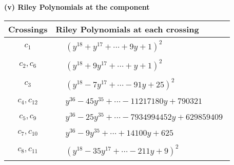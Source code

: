 \documentclass[1p]{elsarticle_modified}
\theoremstyle{definition}
\begin{document}
\newpage\renewcommand{\arraystretch}{1}
\flushleft \textbf{(v) Riley Polynomials at the component}\newline \\
\begin{tabular}{m{50pt}|m{274pt}}
Crossings & \hspace{64pt}Riley Polynomials at each crossing \\
\hline $$\begin{aligned}c_{1}\end{aligned}$$&$\begin{aligned}
&(y^{18}+y^{17}+\cdots+9 y+1)^{2}
\end{aligned}$\\
\hline $$\begin{aligned}c_{2},c_{6}\end{aligned}$$&$\begin{aligned}
&(y^{18}+9 y^{17}+\cdots+y+1)^{2}
\end{aligned}$\\
\hline $$\begin{aligned}c_{3}\end{aligned}$$&$\begin{aligned}
&(y^{18}-7 y^{17}+\cdots-91 y+25)^{2}
\end{aligned}$\\
\hline $$\begin{aligned}c_{4},c_{12}\end{aligned}$$&$\begin{aligned}
&y^{36}-45 y^{35}+\cdots-11217180 y+790321
\end{aligned}$\\
\hline $$\begin{aligned}c_{5},c_{9}\end{aligned}$$&$\begin{aligned}
&y^{36}-25 y^{35}+\cdots-7934994452 y+629859409
\end{aligned}$\\
\hline $$\begin{aligned}c_{7},c_{10}\end{aligned}$$&$\begin{aligned}
&y^{36}-9 y^{35}+\cdots+14100 y+625
\end{aligned}$\\
\hline $$\begin{aligned}c_{8},c_{11}\end{aligned}$$&$\begin{aligned}
&(y^{18}-35 y^{17}+\cdots-211 y+9)^{2}
\end{aligned}$\\
\hline
\end{tabular}\\~\\
\end{document}
